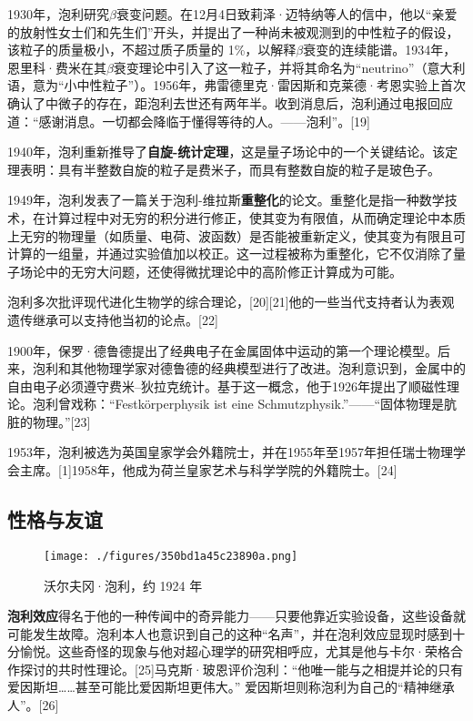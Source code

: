 1930年，泡利研究\(\beta\)衰变问题。在12月4日致莉泽·迈特纳等人的信中，他以“亲爱的放射性女士们和先生们”开头，并提出了一种尚未被观测到的中性粒子的假设，该粒子的质量极小，不超过质子质量的 1\%，以解释\(\beta\)衰变的连续能谱。1934年，恩里科·费米在其\(\beta\)衰变理论中引入了这一粒子，并将其命名为“neutrino”（意大利语，意为“小中性粒子”）。1956年，弗雷德里克·雷因斯和克莱德·考恩实验上首次确认了中微子的存在，距泡利去世还有两年半。收到消息后，泡利通过电报回应道：“感谢消息。一切都会降临于懂得等待的人。——泡利”。[19]

1940年，泡利重新推导了\textbf{自旋-统计定理}，这是量子场论中的一个关键结论。该定理表明：具有半整数自旋的粒子是费米子，而具有整数自旋的粒子是玻色子。

1949年，泡利发表了一篇关于泡利-维拉斯\textbf{重整化}的论文。重整化是指一种数学技术，在计算过程中对无穷的积分进行修正，使其变为有限值，从而确定理论中本质上无穷的物理量（如质量、电荷、波函数）是否能被重新定义，使其变为有限且可计算的一组量，并通过实验值加以校正。这一过程被称为重整化，它不仅消除了量子场论中的无穷大问题，还使得微扰理论中的高阶修正计算成为可能。

泡利多次批评现代进化生物学的综合理论，[20][21]他的一些当代支持者认为表观遗传继承可以支持他当初的论点。[22]

1900年，保罗·德鲁德提出了经典电子在金属固体中运动的第一个理论模型。后来，泡利和其他物理学家对德鲁德的经典模型进行了改进。泡利意识到，金属中的自由电子必须遵守费米–狄拉克统计。基于这一概念，他于1926年提出了顺磁性理论。泡利曾戏称：“Festkörperphysik ist eine Schmutzphysik.”——“固体物理是肮脏的物理。”[23]

1953年，泡利被选为英国皇家学会外籍院士，并在1955年至1957年担任瑞士物理学会主席。[1]1958年，他成为荷兰皇家艺术与科学学院的外籍院士。[24]
\subsection{性格与友谊}
\begin{figure}[ht]
\centering
\texttt{[image: ./figures/350bd1a45c23890a.png]}
\caption{沃尔夫冈·泡利，约 1924 年} \label{fig_Pauli2_4}
\end{figure}
\textbf{泡利效应}得名于他的一种传闻中的奇异能力——只要他靠近实验设备，这些设备就可能发生故障。泡利本人也意识到自己的这种“名声”，并在泡利效应显现时感到十分愉悦。这些奇怪的现象与他对超心理学的研究相呼应，尤其是他与卡尔·荣格合作探讨的共时性理论。[25]马克斯·玻恩评价泡利：“他唯一能与之相提并论的只有爱因斯坦……甚至可能比爱因斯坦更伟大。” 爱因斯坦则称泡利为自己的“精神继承人”。[26]  

